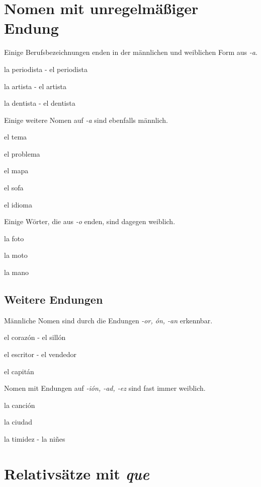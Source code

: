 \section{Nomen mit unregelmäßiger Endung}
Einige Berufsbezeichnungen enden in der männlichen und 
weiblichen Form aus \textit{-a}.
\begin{ejemplos}
    \item la periodista - el periodista
    \item la artista - el artista
    \item la dentista - el dentista
\end{ejemplos}
Einige weitere Nomen auf \textit{-a} sind ebenfalls männlich.
\begin{ejemplos}
    \item el tema
    \item el problema
    \item el mapa
    \item el sofa
    \item el idioma
\end{ejemplos}
Einige Wörter, die aus \textit{-o} enden, sind dagegen 
weiblich.
\begin{ejemplos}
    \item la foto
    \item la moto
    \item la mano
\end{ejemplos}
\subsection*{Weitere Endungen}
Männliche Nomen sind durch die Endungen \textit{-or, \'on, -an}
erkennbar.
\begin{ejemplos}
    \item el coraz\'on - el sill\'on
    \item el escritor - el vendedor
    \item el capit\'an
\end{ejemplos}
Nomen mit Endungen auf \textit{-i\'on, -ad, -ez} sind fast
immer weiblich.
\begin{ejemplos}
    \item la canci\'on
    \item la ciudad
    \item la timidez - la ni\~nes
\end{ejemplos}
\section{Relativsätze mit \textit{que}}